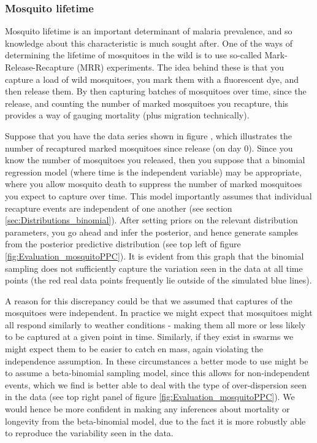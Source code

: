 \documentclass[11pt,fullpage]{book}
\begin{document}
\subsubsection{Mosquito lifetime}
Mosquito lifetime is an important determinant of malaria prevalence, and so knowledge about this characteristic is much sought after. One of the ways of determining the lifetime of mosquitoes in the wild is to use so-called Mark-Release-Recapture (MRR) experiments. The idea behind these is that you capture a load of wild mosquitoes, you mark them with a fluorescent dye, and then release them. By then capturing batches of mosquitoes over time, since the release, and counting the number of marked mosquitoes you recapture, this provides a way of gauging mortality (plus migration technically). 

Suppose that you have the data series shown in figure , which illustrates the number of recaptured marked mosquitoes since release (on day 0). Since you know the number of mosquitoes you released, then you suppose that a binomial regression model (where time is the independent variable) may be appropriate, where you allow mosquito death to suppress the number of marked mosquitoes you expect to capture over time. This model importantly assumes that individual recapture events are independent of one another (see section \ref{sec:Distributions_binomial}). After setting priors on the relevant distribution parameters, you go ahead and infer the posterior, and hence generate samples from the posterior predictive distribution (see top left of figure \ref{fig:Evaluation_mosquitoPPC}). It is evident from this graph that the binomial sampling does not sufficiently capture the variation seen in the data at all time points (the red real data points frequently lie outside of the simulated blue lines). 

A reason for this discrepancy could be that we assumed that captures of the mosquitoes were independent. In practice we might expect that mosquitoes might all respond similarly to weather conditions - making them all more or less likely to be captured at a given point in time. Similarly, if they exist in swarms we might expect them to be easier to catch en mass, again violating the independence assumption. In these circumstances a better mode to use might be to assume a beta-binomial sampling model, since this allows for non-independent events, which we find is better able to deal with the type of over-dispersion seen in the data (see top right panel of figure \ref{fig:Evaluation_mosquitoPPC}). We would hence be more confident in making any inferences about mortality or longevity from the beta-binomial model, due to the fact it is more robustly able to reproduce the variability seen in the data.
\end{document}
